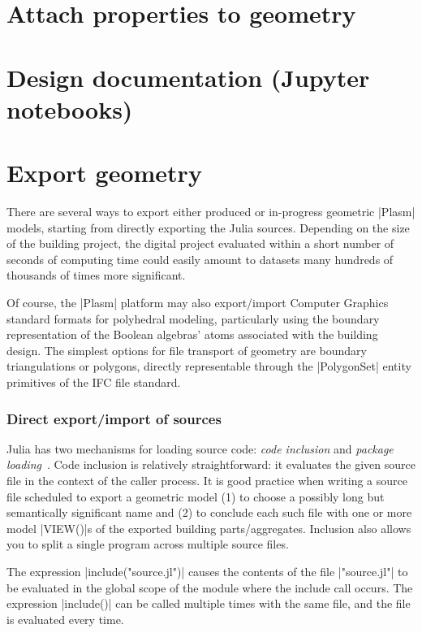 \begin{coding}
\section{Attach properties to geometry}\label{sect:4-4}


\section{Design documentation (Jupyter notebooks)}\label{sect:4-5}


\section{Export geometry}\label{sect:4-6}

There are several ways to export either produced or in-progress geometric |Plasm| models, starting from directly exporting the Julia sources. Depending on the size of the building project, the digital project evaluated within a short number of seconds of computing time could easily amount to datasets many hundreds of thousands of times more significant. 

Of course, the |Plasm| platform may also export/import Computer Graphics standard formats for polyhedral modeling, particularly using the boundary representation of the Boolean algebras’ atoms associated with the building design. The simplest options for file transport of geometry are boundary triangulations or polygons, directly representable through the |PolygonSet| entity primitives of the IFC file standard.

\subsubsection*{Direct export/import of sources}\label{sect:4-6-1}

Julia has two mechanisms for loading source code: \emph{code inclusion} and \emph{package loading}~\cite{}.
Code inclusion is relatively straightforward: it evaluates the given source file in the context of the caller process. It is good practice when writing a source file scheduled to export a geometric model (1) to choose a possibly long but semantically significant name and (2) to conclude each such file with one or more model |VIEW()|s of the exported building parts/aggregates. Inclusion also allows you to split a single program across multiple source files.

The expression |include("source.jl")| causes the contents of the file |"source.jl"| to be evaluated in the global scope of the module where the include call occurs. The expression |include()| can be called multiple times with the same file, and the file is evaluated every time. 


\end{coding}
